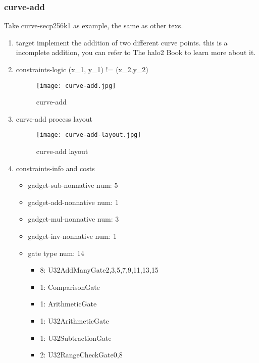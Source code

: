 \subsubsection{curve-add}
\label{curve-add}

Take curve-secp256k1 as example, the same as other texs.

\begin{enumerate}
    \item target
        implement the addition of two different curve points. this is a incomplete addition, you can refer to The halo2 Book \cite{website:halo2-book} to learn more about it.
    \item constraints-logic (x\_1, y\_1) != (x\_2,y\_2)
        \begin{figure}[!ht]
            \centering
            \texttt{[image: curve-add.jpg]}
            \caption{curve-add}
            \label{fig:curve-add}
        \end{figure}
    \item curve-add process layout
        \begin{figure}[!ht]
            \centering
            \texttt{[image: curve-add-layout.jpg]}
            \caption{curve-add layout}
            \label{fig:curve-add-layout}
        \end{figure}
    
    \item constraints-info and costs
        \begin{itemize}
            \item gadget-sub-nonnative num: 5
            \item gadget-add-nonnative num: 1
            \item gadget-mul-nonnative num: 3
            \item gadget-inv-nonnative num: 1
            \item gate type num: 14
                \begin{itemize}
                    \item 8: U32AddManyGate{2,3,5,7,9,11,13,15}
                    \item 1: ComparisonGate
                    \item 1: ArithmeticGate
                    \item 1: U32ArithmeticGate
                    \item 1: U32SubtractionGate
                    \item 2: U32RangeCheckGate{0,8}
                \end{itemize}
        \end{itemize}

\end{enumerate}